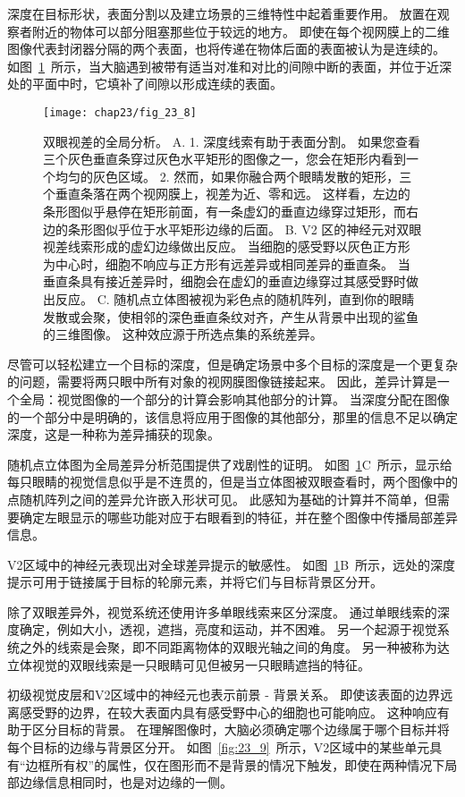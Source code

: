 深度在目标形状，表面分割以及建立场景的三维特性中起着重要作用。
放置在观察者附近的物体可以部分阻塞那些位于较远的地方。
即使在每个视网膜上的二维图像代表封闭器分隔的两个表面，也将传递在物体后面的表面被认为是连续的。
如图~\ref{fig:23_8}~所示，当大脑遇到被带有适当对准和对比的间隙中断的表面，并位于近深处的平面中时，它填补了间隙以形成连续的表面。


\begin{figure}[htbp]
	\centering
	\texttt{[image: chap23/fig\_23\_8]}
	\caption{双眼视差的全局分析。
		A. 1. 深度线索有助于表面分割。
		如果您查看三个灰色垂直条穿过灰色水平矩形的图像之一，您会在矩形内看到一个均匀的灰色区域。
		2. 然而，如果你融合两个眼睛发散的矩形，三个垂直条落在两个视网膜上，视差为近、零和远。
		这样看，左边的条形图似乎悬停在矩形前面，有一条虚幻的垂直边缘穿过矩形，而右边的条形图似乎位于水平矩形边缘的后面。
		B. V2 区的神经元对双眼视差线索形成的虚幻边缘做出反应。
		当细胞的感受野以灰色正方形为中心时，细胞不响应与正方形有远差异或相同差异的垂直条。
		当垂直条具有接近差异时，细胞会在虚幻的垂直边缘穿过其感受野时做出反应\cite{bakin2000visual}。
		C. 随机点立体图被视为彩色点的随机阵列，直到你的眼睛发散或会聚，使相邻的深色垂直条纹对齐，产生从背景中出现的鲨鱼的三维图像。
		这种效应源于所选点集的系统差异。}
	\label{fig:23_8}
\end{figure}


尽管可以轻松建立一个目标的深度，但是确定场景中多个目标的深度是一个更复杂的问题，需要将两只眼中所有对象的视网膜图像链接起来。
因此，差异计算是一个全局：视觉图像的一个部分的计算会影响其他部分的计算。
当深度分配在图像的一个部分中是明确的，该信息将应用于图像的其他部分，那里的信息不足以确定深度，这是一种称为差异捕获的现象。


随机点立体图为全局差异分析范围提供了戏剧性的证明。
如图~\ref{fig:23_8}C~所示，显示给每只眼睛的视觉信息似乎是不连贯的，但是当立体图被双眼查看时，两个图像中的点随机阵列之间的差异允许嵌入形状可见。
此感知为基础的计算并不简单，但需要确定左眼显示的哪些功能对应于右眼看到的特征，并在整个图像中传播局部差异信息。


V2区域中的神经元表现出对全球差异提示的敏感性。 
如图~\ref{fig:23_8}B~所示，远处的深度提示可用于链接属于目标的轮廓元素，并将它们与目标背景区分开。


除了双眼差异外，视觉系统还使用许多单眼线索来区分深度。
通过单眼线索的深度确定，例如大小，透视，遮挡，亮度和运动，并不困难。
另一个起源于视觉系统之外的线索是会聚，即不同距离物体的双眼光轴之间的角度。
另一种被称为达立体视觉的双眼线索是一只眼睛可见但被另一只眼睛遮挡的特征。


初级视觉皮层和V2区域中的神经元也表示前景 - 背景关系。
即使该表面的边界远离感受野的边界，在较大表面内具有感受野中心的细胞也可能响应。
这种响应有助于区分目标的背景。
在理解图像时，大脑必须确定哪个边缘属于哪个目标并将每个目标的边缘与背景区分开。 
如图~\ref{fig:23_9}~所示，V2区域中的某些单元具有“边框所有权”的属性，仅在图形而不是背景的情况下触发，即使在两种情况下局部边缘信息相同时，也是对边缘的一侧。


